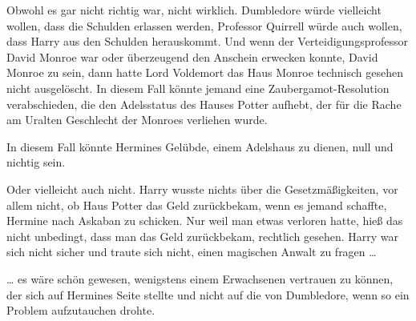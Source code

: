 Obwohl es gar nicht richtig war, nicht wirklich. Dumbledore würde vielleicht wollen, dass die Schulden erlassen werden, Professor Quirrell würde auch wollen, dass Harry aus den Schulden herauskommt. Und wenn der Verteidigungsprofessor David Monroe war oder überzeugend den Anschein erwecken konnte, David Monroe zu sein, dann hatte Lord Voldemort das Haus Monroe technisch gesehen nicht ausgelöscht. In diesem Fall könnte jemand eine Zaubergamot-Resolution verabschieden, die den Adelsstatus des Hauses Potter aufhebt, der für die Rache am Uralten Geschlecht der Monroes verliehen wurde.

In diesem Fall könnte Hermines Gelübde, einem Adelshaus zu dienen, null und nichtig sein.

Oder vielleicht auch nicht. Harry wusste nichts über die Gesetzmäßigkeiten, vor allem nicht, ob Haus Potter das Geld zurückbekam, wenn es jemand schaffte, Hermine nach Askaban zu schicken. Nur weil man etwas verloren hatte, hieß das nicht unbedingt, dass man das Geld zurückbekam, rechtlich gesehen. Harry war sich nicht sicher und traute sich nicht, einen magischen Anwalt zu fragen …

… es wäre schön gewesen, wenigstens einem Erwachsenen vertrauen zu können, der sich auf Hermines Seite stellte und nicht auf die von Dumbledore, wenn so ein Problem aufzutauchen drohte.


